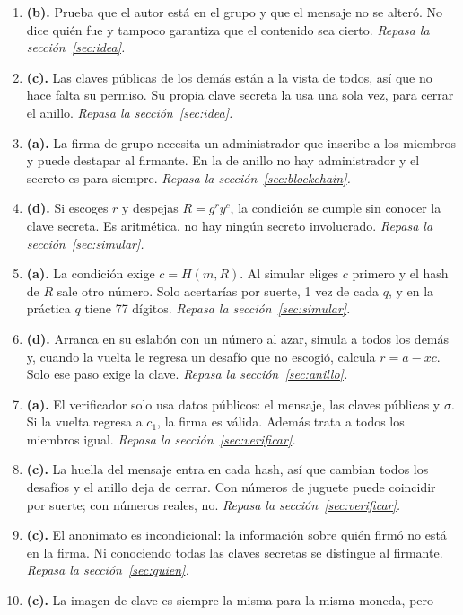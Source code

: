 \documentclass[11pt,a4paper]{article}
\theoremstyle{definition}
\theoremstyle{plain}
\theoremstyle{remark}
\begin{document}
\begin{enumerate}[leftmargin=2em,itemsep=0.6em,label=\textbf{\arabic*.}]
\item \textbf{(b).} Prueba que el autor está en el grupo y que el mensaje no se
  alteró. No dice quién fue y tampoco garantiza que el contenido sea cierto.
  \emph{Repasa la sección~\ref{sec:idea}.}
\item \textbf{(c).} Las claves públicas de los demás están a la vista de todos, así
  que no hace falta su permiso. Su propia clave secreta la usa una sola vez, para
  cerrar el anillo. \emph{Repasa la sección~\ref{sec:idea}.}
\item \textbf{(a).} La firma de grupo necesita un administrador que inscribe a los
  miembros y puede destapar al firmante. En la de anillo no hay administrador y el
  secreto es para siempre. \emph{Repasa la sección~\ref{sec:blockchain}.}
\item \textbf{(d).} Si escoges $r$ y despejas $R = g^{r} y^{c}$, la condición
   se cumple sin conocer la clave secreta. Es aritmética, no hay ningún
  secreto involucrado. \emph{Repasa la sección~\ref{sec:simular}.}
\item \textbf{(a).} La condición  exige $c = H(m, R)$. Al simular eliges $c$
  primero y el hash de $R$ sale otro número. Solo acertarías por suerte, 1 vez de
  cada $q$, y en la práctica $q$ tiene 77 dígitos. \emph{Repasa la
  sección~\ref{sec:simular}.}
\item \textbf{(d).} Arranca en su eslabón con un número al azar, simula a todos los
  demás y, cuando la vuelta le regresa un desafío que no escogió, calcula
  $r = a - x c$. Solo ese paso exige la clave. \emph{Repasa la
  sección~\ref{sec:anillo}.}
\item \textbf{(a).} El verificador solo usa datos públicos: el mensaje, las claves
  públicas y $\sigma$. Si la vuelta regresa a $c_1$, la firma es válida. Además trata
  a todos los miembros igual. \emph{Repasa la sección~\ref{sec:verificar}.}
\item \textbf{(c).} La huella del mensaje entra en cada hash, así que cambian todos
  los desafíos y el anillo deja de cerrar. Con números de juguete puede coincidir por
  suerte; con números reales, no. \emph{Repasa la sección~\ref{sec:verificar}.}
\item \textbf{(c).} El anonimato es incondicional: la información sobre quién firmó no
  está en la firma. Ni conociendo todas las claves secretas se distingue al firmante.
  \emph{Repasa la sección~\ref{sec:quien}.}
\item \textbf{(c).} La imagen de clave es siempre la misma para la misma moneda, pero

\end{enumerate}
\end{document}

